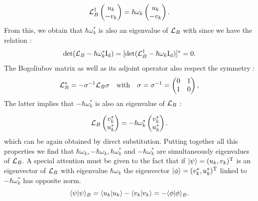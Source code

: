 \begin{equation}
    \mathcal{L}_B^\dagger \begin{pmatrix}
        u_k \\
        -v_k
    \end{pmatrix} = \hbar\omega_k \begin{pmatrix}
        u_k \\
        -v_k
    \end{pmatrix}.
\end{equation}
From this, we obtain that $\hbar\omega_k^*$ is also an eigenvalue of $\mathcal{L}_B$ with since we have the relation :
\begin{equation}
    \mathrm{det}(\mathcal{L}_B-\hbar\omega_k^*\mathrm{I_d}) = [\mathrm{det}(\mathcal{L}_B^\dagger-\hbar\omega_k\mathrm{I_d})]^* = 0.
\end{equation}
The Bogoliubov matrix as well as its adjoint operator also respect the symmetry :
\begin{equation}
    \mathcal{L}_B^* = -\sigma^{-1} \mathcal{L}_B \sigma \ \ \ \mathrm{with} \ \ \ \sigma = \sigma^{-1} =\begin{pmatrix}
        0 & 1 \\
        1 & 0
    \end{pmatrix},
    \label{eq:symetry_bog_2}
\end{equation}
The latter implies that $-\hbar\omega_k^*$ is also an eigenvalue of $\mathcal{L}_B$ :

\begin{equation}
    \mathcal{L}_B \begin{pmatrix}
        v_k^* \\
        u_k^*
    \end{pmatrix} = -\hbar\omega_k^* \begin{pmatrix}
        v_k^* \\
        u_k^*
    \end{pmatrix}.
\end{equation}
which can be again obtained by direct substitution. Putting together all this properties we find that $\hbar \omega_k, -\hbar \omega_k, \hbar\omega_k^*$ and $-\hbar\omega_k^*$ are simultaneously eigenvalues of $\mathcal{L}_B$.
A special attention must be given to the fact that if $\ket{\psi}=(u_k,v_k)^\mathrm{T}$ is an eigenvector of $\mathcal{L}_B$ with eigenvalue $\hbar\omega_k$ the eigenvector $\ket{\phi}=(v_k^*,u_k^*)^\mathrm{T}$ linked to $-\hbar\omega_k^*$ has opposite norm.
\begin{equation}
    \langle \psi| \psi \rangle_B = \bra{u_k}\ket{u_k} - \bra{v_k}\ket{v_k} = -\langle \phi| \phi \rangle_B.
\end{equation}
\bigskip


